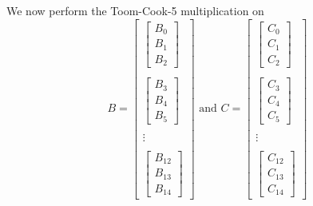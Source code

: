 \documentclass[
11pt,notheorems,hyperref={pdfauthor=whatever}
]{beamer}
\begin{document}
\begin{frame}
    We now perform the Toom-Cook-5 multiplication on
    \[B=
        \begin{bmatrix}
            \begin{bmatrix}
                B_{0} \\ B_{1} \\ B_{2} 
            \end{bmatrix} \\ \\
            \begin{bmatrix}
                B_{3} \\ B_{4} \\ B_{5}
            \end{bmatrix} \\ \\
            \vdots \\\\
            \begin{bmatrix}
                B_{12} \\ B_{13} \\ B_{14}
            \end{bmatrix}
        \end{bmatrix}\text{ and }
    C =
    \begin{bmatrix}
        \begin{bmatrix}
            C_{0} \\ C_{1} \\ C_{2} 
        \end{bmatrix} \\ \\
        \begin{bmatrix}
            C_{3} \\ C_{4} \\ C_{5}
        \end{bmatrix} \\ \\
        \vdots \\\\
        \begin{bmatrix}
            C_{12} \\ C_{13} \\ C_{14}
        \end{bmatrix}
    \end{bmatrix}
    \]
\end{frame}
\end{document}
